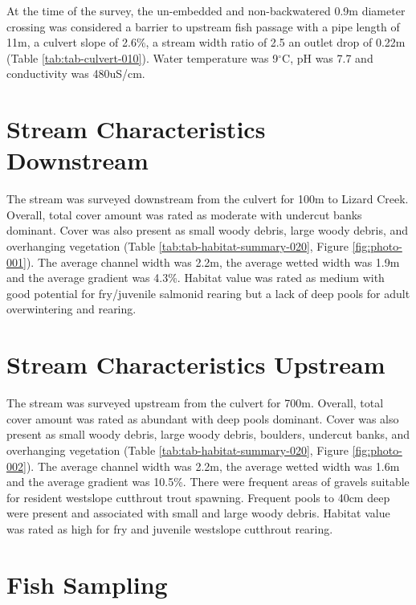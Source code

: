 \documentclass[
]{book}
\begin{document}
At the time of the survey, the un-embedded and non-backwatered 0.9m diameter crossing was considered a barrier to upstream fish passage with a pipe length of 11m, a culvert slope of 2.6\%, a stream width ratio of 2.5 an outlet drop of 0.22m (Table \ref{tab:tab-culvert-010}). Water temperature was 9\(^\circ\)C, pH was 7.7 and conductivity was 480uS/cm.

\hypertarget{stream-characteristics-downstream}{%
\section*{Stream Characteristics Downstream}\label{stream-characteristics-downstream}}

The stream was surveyed downstream from the culvert for 100m to Lizard Creek. Overall, total cover amount was rated as moderate with undercut banks dominant. Cover was also present as small woody debris, large woody debris, and overhanging vegetation (Table \ref{tab:tab-habitat-summary-020}, Figure \ref{fig:photo-001}). The average channel width was 2.2m, the average wetted width was 1.9m and the average gradient was 4.3\%. Habitat value was rated as medium with good potential for fry/juvenile salmonid rearing but a lack of deep pools for adult overwintering and rearing.

\hypertarget{stream-characteristics-upstream}{%
\section*{Stream Characteristics Upstream}\label{stream-characteristics-upstream}}

The stream was surveyed upstream from the culvert for 700m. Overall, total cover amount was rated as abundant with deep pools dominant. Cover was also present as small woody debris, large woody debris, boulders, undercut banks, and overhanging vegetation (Table \ref{tab:tab-habitat-summary-020}, Figure \ref{fig:photo-002}). The average channel width was 2.2m, the average wetted width was 1.6m and the average gradient was 10.5\%. There were frequent areas of gravels suitable for resident westslope cutthrout trout spawning. Frequent pools to 40cm deep were present and associated with small and large woody debris. Habitat value was rated as high for fry and juvenile westslope cutthrout rearing.

\hypertarget{fish-sampling}{%
\section*{Fish Sampling}\label{fish-sampling}}
\end{document}
